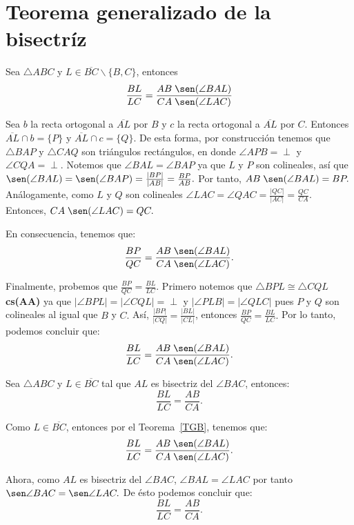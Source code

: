\section{Teorema generalizado de la bisectríz}
\begin{teo}\label{TGB}
Sea $\triangle ABC$ y $L\in\overline{BC}\backslash \{B,C\}$, entonces
$$\frac{BL}{LC}=\frac{AB\;\sen(\angle BAL)}{CA\;\sen(\angle LAC)}$$
\end{teo}
\begin{dem} Sea $b$ la recta ortogonal a $\overline{AL}$ por $B$ y $c$ la recta ortogonal a $\overline{AL}$ por $C$. Entonces $\overline{AL}\cap b=\{P\}$ y $\overline{AL}\cap c=\{Q\}.$ De esta forma, por construcción tenemos que $\triangle BAP$ y  $\triangle CAQ$ son triángulos rectángulos, en donde  $\angle APB=\perp$ y $\angle CQA=\perp.$
Notemos que $\angle BAL=\angle BAP$ ya que $L$ y $P$ son colineales, así que $\sen(\angle BAL)=\sen(\angle BAP)=\frac{|BP|}{|AB|}=\frac{BP}{AB}.$
Por tanto, $AB\;\sen(\angle BAL)=BP.$ Análogamente, como $L$ y $Q$ son colineales $\angle LAC=\angle QAC=\frac{|QC|}{|AC|}=\frac{QC}{CA}.$ Entonces, $CA\;\sen(\angle LAC)=QC.$

En consecuencia, tenemos que:$$\frac{BP}{QC}=\frac{AB\;\sen(\angle BAL)}{CA\;\sen(\angle LAC)}.$$

Finalmente, probemos que $\frac{BP}{QC}=\frac{BL}{LC}.$ 
Primero notemos que $\triangle BPL\cong\triangle CQL$ \textbf{cs(AA)} ya que $|\angle BPL|=|\angle CQL|=\perp$ y $|\angle PLB|=|\angle QLC|$ pues $P$ y $Q$ son colineales al igual que $B$ y $C.$
Así, $\frac{|BP|}{|CQ|}=\frac{|BL|}{|CL|}$, entonces $\frac{BP}{QC}=\frac{BL}{LC}.$
Por lo tanto, podemos concluir que:$$\frac{BL}{LC}=\frac{AB\;\sen(\angle BAL)}{CA\;\sen(\angle LAC)}.$$
\end{dem}


\begin{cor}
Sea $\triangle ABC$ y $L\in\overline{BC}$ tal que $AL$ es bisectriz del $\angle BAC$, entonces:
$$\frac{BL}{LC}=\frac{AB}{CA}.$$
\end{cor}
\begin{pba}
Como $L\in\overline{BC}$, entonces por el Teorema~\ref{TGB}, tenemos que: 
$$\frac{BL}{LC}=\frac{AB\;\sen(\angle BAL)}{CA\;\sen(\angle LAC)}.$$

Ahora, como $AL$ es bisectriz del $\angle BAC$, $\angle BAL=\angle LAC$ por tanto $\sen\angle BAC=\sen\angle LAC.$
De ésto podemos concluir que:
$$\frac{BL}{LC}=\frac{AB}{CA}.$$
\end{pba}

